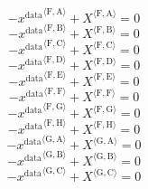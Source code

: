 \begin{equation}
-{x^{\mathrm{data}}}^{\langle \mathrm{\mathrm{F}},\mathrm{\mathrm{A}}\rangle} + {X}^{\langle \mathrm{F},\mathrm{A}\rangle} = 0
\end{equation}
\begin{equation}
-{x^{\mathrm{data}}}^{\langle \mathrm{\mathrm{F}},\mathrm{\mathrm{B}}\rangle} + {X}^{\langle \mathrm{F},\mathrm{B}\rangle} = 0
\end{equation}
\begin{equation}
-{x^{\mathrm{data}}}^{\langle \mathrm{\mathrm{F}},\mathrm{\mathrm{C}}\rangle} + {X}^{\langle \mathrm{F},\mathrm{C}\rangle} = 0
\end{equation}
\begin{equation}
-{x^{\mathrm{data}}}^{\langle \mathrm{\mathrm{F}},\mathrm{\mathrm{D}}\rangle} + {X}^{\langle \mathrm{F},\mathrm{D}\rangle} = 0
\end{equation}
\begin{equation}
-{x^{\mathrm{data}}}^{\langle \mathrm{\mathrm{F}},\mathrm{\mathrm{E}}\rangle} + {X}^{\langle \mathrm{F},\mathrm{E}\rangle} = 0
\end{equation}
\begin{equation}
-{x^{\mathrm{data}}}^{\langle \mathrm{\mathrm{F}},\mathrm{\mathrm{F}}\rangle} + {X}^{\langle \mathrm{F},\mathrm{F}\rangle} = 0
\end{equation}
\begin{equation}
-{x^{\mathrm{data}}}^{\langle \mathrm{\mathrm{F}},\mathrm{\mathrm{G}}\rangle} + {X}^{\langle \mathrm{F},\mathrm{G}\rangle} = 0
\end{equation}
\begin{equation}
-{x^{\mathrm{data}}}^{\langle \mathrm{\mathrm{F}},\mathrm{\mathrm{H}}\rangle} + {X}^{\langle \mathrm{F},\mathrm{H}\rangle} = 0
\end{equation}
\begin{equation}
-{x^{\mathrm{data}}}^{\langle \mathrm{\mathrm{G}},\mathrm{\mathrm{A}}\rangle} + {X}^{\langle \mathrm{G},\mathrm{A}\rangle} = 0
\end{equation}
\begin{equation}
-{x^{\mathrm{data}}}^{\langle \mathrm{\mathrm{G}},\mathrm{\mathrm{B}}\rangle} + {X}^{\langle \mathrm{G},\mathrm{B}\rangle} = 0
\end{equation}
\begin{equation}
-{x^{\mathrm{data}}}^{\langle \mathrm{\mathrm{G}},\mathrm{\mathrm{C}}\rangle} + {X}^{\langle \mathrm{G},\mathrm{C}\rangle} = 0
\end{equation}
